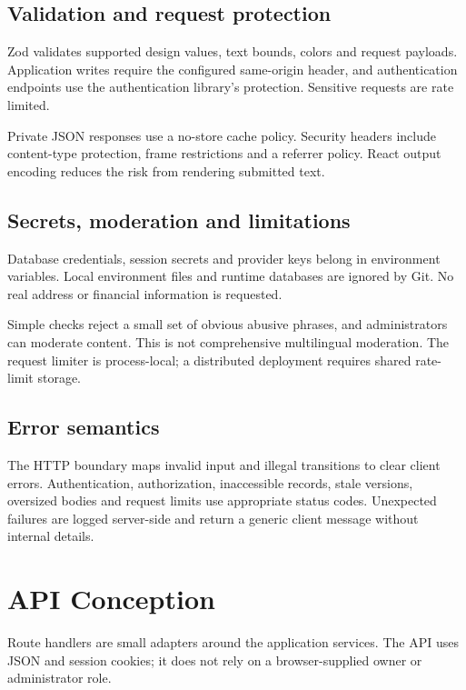 \documentclass[11pt,a4paper]{article}
\begin{document}
\subsection{Validation and request protection}
Zod validates supported design values, text bounds, colors and request payloads. Application writes require the configured same-origin header, and authentication endpoints use the authentication library's protection. Sensitive requests are rate limited.

Private JSON responses use a no-store cache policy. Security headers include content-type protection, frame restrictions and a referrer policy. React output encoding reduces the risk from rendering submitted text.

\subsection{Secrets, moderation and limitations}
Database credentials, session secrets and provider keys belong in environment variables. Local environment files and runtime databases are ignored by Git. No real address or financial information is requested.

Simple checks reject a small set of obvious abusive phrases, and administrators can moderate content. This is not comprehensive multilingual moderation. The request limiter is process-local; a distributed deployment requires shared rate-limit storage.

\subsection{Error semantics}
The HTTP boundary maps invalid input and illegal transitions to clear client errors. Authentication, authorization, inaccessible records, stale versions, oversized bodies and request limits use appropriate status codes. Unexpected failures are logged server-side and return a generic client message without internal details.

\section{API Conception}

Route handlers are small adapters around the application services. The API uses JSON and session cookies; it does not rely on a browser-supplied owner or administrator role.
\end{document}
